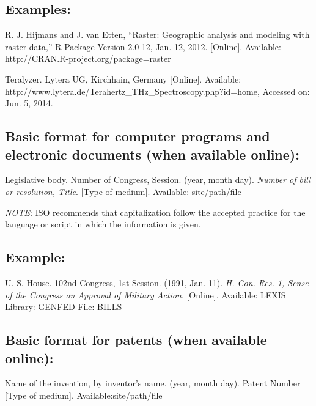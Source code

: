 \documentclass[journal]{IEEEtai}
\begin{document}
\subsection*{Examples:}\vspace*{-12pt}

\begin{thebibliography}{34}
\setcounter{enumiv}{17}

\bibitem{}R. J. Hijmans and J. van Etten, ``Raster: Geographic analysis and modeling with raster data,'' R Package Version 2.0-12, Jan. 12, 2012. [Online]. Available: http://CRAN.R-project.org/package=raster 

\bibitem{}Teralyzer. Lytera UG, Kirchhain, Germany [Online]. Available: http://www.lytera.de/Terahertz\_THz\_Spectroscopy.php?id=home, Accessed on: Jun. 5, 2014.
\end{thebibliography}

\subsection*{Basic format for computer programs and electronic documents (when available online):}\vspace*{-12pt}
\begin{thebibliography}{34}
\item[] Legislative body. Number of Congress, Session. (year, month day). {\em Number of bill or resolution, Title}. [Type of medium]. Available: site/path/file

\item[] {\em NOTE:} ISO recommends that capitalization follow the accepted practice for the language or script in which the information is given.
\end{thebibliography}

\subsection*{Example:}\vspace*{-12pt}

\begin{thebibliography}{34}
\setcounter{enumiv}{19}

\bibitem{}U. S. House. 102nd Congress, 1st Session. (1991, Jan. 11). {\em H. Con. Res. 1, Sense of the Congress on Approval of Military Action}. [Online]. Available: LEXIS Library: GENFED File: BILLS 
\end{thebibliography}

\subsection*{Basic format for patents (when available online):}\vspace*{-12pt}
\begin{thebibliography}{34}
\item[] Name of the invention, by inventor’s name. (year, month day). Patent Number [Type of medium]. Available:site/path/file
\end{thebibliography}
\end{document}
